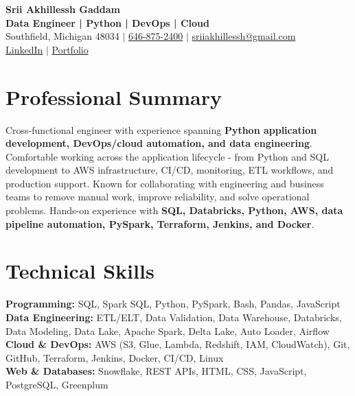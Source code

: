 \documentclass[letterpaper,10pt]{article}
\begin{document}
\fontsize{9.35pt}{10.45pt}\selectfont

\begin{center}
    {\LARGE \textbf{Srii Akhillessh Gaddam}} \\[-1pt]
    \textbf{Data Engineer | Python | DevOps | Cloud} \\[2pt]
    Southfield, Michigan 48034 $|$
    \href{tel:6468752400}{646-875-2400} $|$
    \href{mailto:sriiakhillessh@gmail.com}{sriiakhillessh@gmail.com} \\[1pt]
    \href{https://www.linkedin.com/in/srii-akhiilessh-gaddam-b48668191/}{LinkedIn} $|$
    \href{https://sriiakhillesshg.github.io/portfolio/}{Portfolio}
\end{center}
\vspace{-8pt}

\section{Professional Summary}
\small{Cross-functional engineer with experience spanning \textbf{Python application development, DevOps/cloud automation, and data engineering}. Comfortable working across the application lifecycle - from Python and SQL development to AWS infrastructure, CI/CD, monitoring, ETL workflows, and production support. Known for collaborating with engineering and business teams to remove manual work, improve reliability, and solve operational problems. Hands-on experience with \textbf{SQL, Databricks, Python, AWS, data pipeline automation, PySpark, Terraform, Jenkins, and Docker}.}

\section{Technical Skills}
\small{
\textbf{Programming:} SQL, Spark SQL, Python, PySpark, Bash, Pandas, JavaScript \\
\textbf{Data Engineering:} ETL/ELT, Data Validation, Data Warehouse, Databricks, Data Modeling, Data Lake, Apache Spark, Delta Lake, Auto Loader, Airflow \\
\textbf{Cloud \& DevOps:} AWS (S3, Glue, Lambda, Redshift, IAM, CloudWatch), Git, GitHub, Terraform, Jenkins, Docker, CI/CD, Linux \\
\textbf{Web \& Databases:} Snowflake, REST APIs, HTML, CSS, JavaScript, PostgreSQL, Greenplum
}
\end{document}
